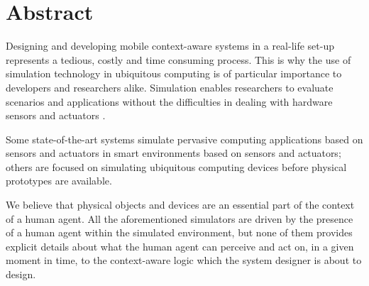 \begingroup
\let\clearpage\relax
\let\cleardoublepage\relax
\let\cleardoublepage\relax

\chapter*{Abstract}
Designing and developing mobile context-aware systems in a real-life set-up represents a tedious, costly and time consuming process. This is why the use of simulation technology in ubiquitous computing is of particular importance to developers and researchers alike. Simulation enables researchers to evaluate scenarios and applications
without the difficulties in dealing with hardware sensors and actuators \cite{reynolds2006requirements}.

Some state-of-the-art systems simulate pervasive computing applications based on sensors and actuators in smart environments based on sensors and actuators; others are focused on simulating ubiquitous computing devices before physical prototypes are available.


We believe that physical objects and devices are an essential part of the context of a human agent. All the aforementioned simulators are driven by the presence of a human agent within the simulated environment, but none of them provides explicit details about what the human agent can perceive and act on, in a given moment in time, to the context-aware logic which the system designer is about to design.


